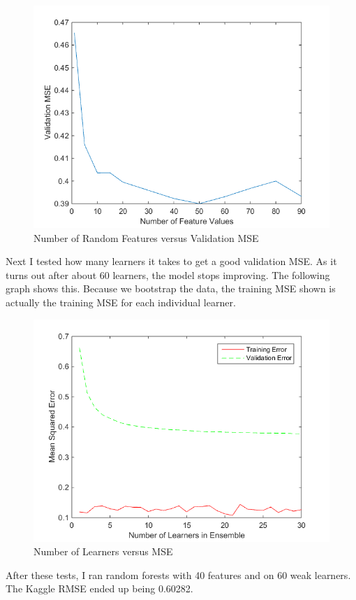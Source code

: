 \documentclass[twoside,11pt]{article}
\theoremstyle{definition}
\begin{document}
\begin{figure}[h!]
\centering
\includegraphics[width=4 in]{numFeatValuesVersusMSE.png}
\caption{Number of Random Features versus Validation MSE}
\end{figure}

\newpage

Next I tested how many learners it takes to get a good validation MSE. As it turns out after about 60 learners, the model stops improving. The following graph shows this. Because we bootstrap the data, the training MSE shown is actually the training MSE for each individual learner. \\

\begin{figure}[h!]
\centering
\includegraphics[width=4 in]{numLearnersVersusMSE.png}
\caption{Number of Learners versus MSE}
\end{figure}

After these tests, I ran random forests with 40 features and on 60 weak learners. The Kaggle RMSE ended up being 0.60282. 

\newpage
\end{document}
